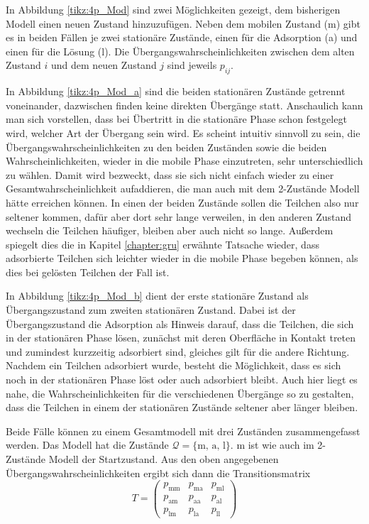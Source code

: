 In Abbildung \ref{tikz:4p_Mod} sind zwei Möglichkeiten gezeigt, dem bisherigen Modell einen neuen Zustand hinzuzufügen.
Neben dem mobilen Zustand (m) gibt es in beiden Fällen je zwei stationäre Zustände, einen für die Adsorption (a) und einen für die Lösung (l). Die Übergangswahrscheinlichkeiten zwischen dem alten Zustand $i$ und dem neuen Zustand $j$ sind jeweils $p_{ij}$. 

In Abbildung \ref{tikz:4p_Mod_a} sind die beiden stationären Zustände getrennt voneinander, dazwischen finden keine direkten Übergänge statt. 
Anschaulich kann man sich vorstellen, dass bei Übertritt in die stationäre Phase schon festgelegt wird, welcher Art der Übergang sein wird. Es scheint intuitiv sinnvoll zu sein, die Übergangswahrscheinlichkeiten zu den beiden Zuständen sowie die beiden Wahrscheinlichkeiten, wieder in die mobile Phase einzutreten, sehr unterschiedlich zu wählen. Damit wird bezweckt, dass sie sich nicht einfach wieder zu einer Gesamtwahrscheinlichkeit aufaddieren, die man auch mit dem 2-Zustände Modell hätte erreichen können. In einen der beiden Zustände sollen die Teilchen also nur seltener kommen, dafür aber dort sehr lange verweilen, in den anderen Zustand wechseln die Teilchen häufiger, bleiben aber auch nicht so lange. Außerdem spiegelt dies die in Kapitel \ref{chapter:gru} erwähnte Tatsache wieder, dass adsorbierte Teilchen sich leichter wieder in die mobile Phase begeben können, als dies bei gelösten Teilchen der Fall ist.

In Abbildung \ref{tikz:4p_Mod_b} dient der erste stationäre Zustand als Übergangszustand zum zweiten stationären Zustand. Dabei ist der Übergangszustand die Adsorption als Hinweis darauf, dass die Teilchen, die sich in der stationären Phase lösen, zunächst mit deren Oberfläche in Kontakt treten und zumindest kurzzeitig adsorbiert sind, gleiches gilt für die andere Richtung. Nachdem ein Teilchen adsorbiert wurde, besteht die Möglichkeit, dass es sich noch in der stationären Phase löst oder auch adsorbiert bleibt. Auch hier liegt es nahe, die Wahrscheinlichkeiten für die verschiedenen Übergänge so zu gestalten, dass die Teilchen in einem der stationären Zustände seltener aber länger bleiben.

Beide Fälle können zu einem Gesamtmodell mit drei Zuständen zusammengefasst werden. Das Modell hat die Zustände $\mathcal{Q} = \{\text{m, a, l}\}$. m ist wie auch im 2-Zustände Modell der Startzustand. Aus den oben angegebenen Übergangswahrscheinlichkeiten ergibt sich dann die Transitionsmatrix 
\begin{equation}
T= 
\begin{pmatrix}
p_{\text{mm}} &  p_{\text{ma}} & p_{\text{ml}} \\
p_{\text{am}} &  p_{\text{aa}} & p_{\text{al}} \\
p_{\text{lm}} &  p_{\text{la}} & p_{\text{ll}} 
\end{pmatrix}
\label{3s_Transit}
\end{equation}
  
